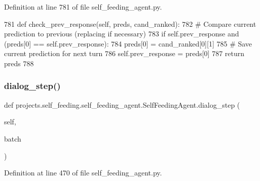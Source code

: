 Definition at line 781 of file self\+\_\+feeding\+\_\+agent.\+py.


\begin{DoxyCode}
781     \textcolor{keyword}{def }check\_prev\_response(self, preds, cand\_ranked):
782         \textcolor{comment}{# Compare current prediction to previous (replacing if necessary)}
783         \textcolor{keywordflow}{if} self.prev\_response \textcolor{keywordflow}{and} (preds[0] == self.prev\_response):
784             preds[0] = cand\_ranked[0][1]
785         \textcolor{comment}{# Save current prediction for next turn}
786         self.prev\_response = preds[0]
787         \textcolor{keywordflow}{return} preds
788 
\end{DoxyCode}
\mbox{\label{classprojects_1_1self__feeding_1_1self__feeding__agent_1_1SelfFeedingAgent_a29d503e95d996bbe351fe860631c3162}} 
\subsubsection{\texorpdfstring{dialog\+\_\+step()}{dialog\_step()}}
{\footnotesize\ttfamily def projects.\+self\+\_\+feeding.\+self\+\_\+feeding\+\_\+agent.\+Self\+Feeding\+Agent.\+dialog\+\_\+step (\begin{DoxyParamCaption}\item[{}]{self,  }\item[{}]{batch }\end{DoxyParamCaption})}



Definition at line 470 of file self\+\_\+feeding\+\_\+agent.\+py.


